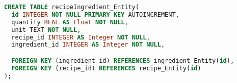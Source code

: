 \begin{lstlisting}[caption={RecipeIngredient Entity},label={lst:recipeIngredient_entity}, language=sql]
CREATE TABLE recipeIngredient_Entity(
  id INTEGER NOT NULL PRIMARY KEY AUTOINCREMENT,
  quantity REAL AS Float NOT NULL,
  unit TEXT NOT NULL,
  recipe_id INTEGER AS Integer NOT NULL,
  ingredient_id INTEGER AS Integer NOT NULL,

  FOREIGN KEY (ingredient_id) REFERENCES ingredient_Entity(id),
  FOREIGN KEY (recipe_id) REFERENCES recipe_Entity(id)
);
\end{lstlisting}